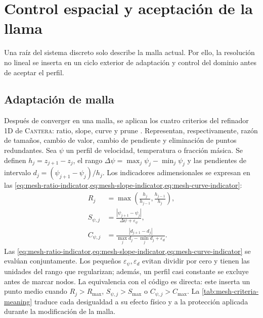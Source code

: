 \documentclass[12pt,a4paper,twoside,openany]{book}
\newcommand{\abs}[1]{\left\lvert #1\right\rvert}
\newcommand{\Cantera}{\textsc{Cantera}\xspace}
\begin{document}
\section{Control espacial y aceptación de la llama}
\label{sec:spatial-method}

Una raíz del sistema discreto solo describe la malla actual. Por ello, la
resolución no lineal se inserta en un ciclo exterior de adaptación y control
del dominio antes de aceptar el perfil.

\subsection{Adaptación de malla}

Después de converger en una malla, se aplican los cuatro criterios del refinador
1D de \Cantera: ratio, slope, curve y prune \cite{CanteraDocs32}.
Representan, respectivamente, razón de tamaños, cambio de valor, cambio de
pendiente y eliminación de puntos redundantes. Sea \(\psi\) un perfil de
velocidad, temperatura o fracción másica. Se definen
\(h_j=z_{j+1}-z_j\), el rango
\(\Delta\psi=\max_j\psi_j-\min_j\psi_j\) y las pendientes de intervalo
\(d_j=(\psi_{j+1}-\psi_j)/h_j\). Los indicadores adimensionales se expresan en las \cref{eq:mesh-ratio-indicator,eq:mesh-slope-indicator,eq:mesh-curve-indicator}:
\begin{align}
  R_j&=\max\left(\frac{h_j}{h_{j-1}},\frac{h_{j-1}}{h_j}\right),
  \label{eq:mesh-ratio-indicator}\\
  S_{\psi,j}&=\frac{\abs{\psi_{j+1}-\psi_j}}
  {\Delta\psi+\varepsilon_\psi},
  \label{eq:mesh-slope-indicator}\\
  C_{\psi,j}&=\frac{\abs{d_{j+1}-d_j}}
  {\max_jd_j-\min_jd_j+\varepsilon_d}.
  \label{eq:mesh-curve-indicator}
\end{align}
Las \cref{eq:mesh-ratio-indicator,eq:mesh-slope-indicator,eq:mesh-curve-indicator}
se evalúan conjuntamente. Los pequeños \(\varepsilon_\psi,\varepsilon_d\) evitan
dividir por cero y tienen las unidades del rango que regularizan; además,
un perfil casi constante se excluye antes de marcar nodos. La equivalencia con
el código es directa: este inserta un punto medio cuando
\(R_j>R_{\max}\), \(S_{\psi,j}>S_{\max}\) o
\(C_{\psi,j}>C_{\max}\).
La \cref{tab:mesh-criteria-meaning} traduce cada desigualdad a su efecto físico y
a la protección aplicada durante la modificación de la malla.
\end{document}
